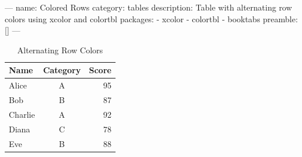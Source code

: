 ---
name: Colored Rows
category: tables
description: Table with alternating row colors using xcolor and colortbl
packages:
  - xcolor
  - colortbl
  - booktabs
preamble: []
---
\begin{table}[htbp]
\centering
\caption{Alternating Row Colors}
\begin{tabular}{l c r}
  \toprule
  \rowcolor{gray!30}
  Name & Category & Score \\
  \midrule
  Alice   & A & 95 \\
  Bob     & B & 87 \\
  Charlie & A & 92 \\
  Diana   & C & 78 \\
  Eve     & B & 88 \\
  \bottomrule
\end{tabular}
\end{table}

